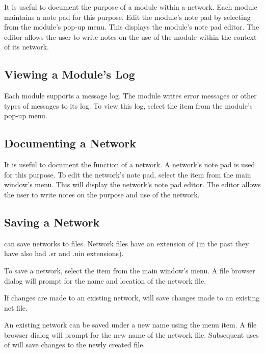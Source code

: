 It is useful to document the purpose of a module within a network.
Each module maintains a note pad for this purpose.  Edit the
module's note pad by selecting  from the module's
pop-up menu.  This displays the module's note pad editor.  The 
editor allows the user to write notes on the use of the
module within the context of its network.

\subsection{Viewing a Module's Log}
\label{sec:viewmodslog}

Each module supports a message log.  The module writes error messages or
other types of messages to its log.  To view this log, select the
 item from the module's pop-up menu.

\subsection{Documenting a Network}
\label{sec:docnetwork}

It is useful to document the function of a network.  A network's note
pad is used for this purpose.  To edit the network's note pad,
select the  item from the main window's 
menu.  This will display the network's note pad editor.  The editor
allows the user to write notes on the purpose and use of the network.


\subsection{Saving a Network}
\label{sec:savenet}

\sr{} can save networks to files.  Network files have an extension of
 (in the past they have also had .sr and .uin
extensions).  

To save a network, select the  item from the main window's
 menu.  A file browser dialog will prompt for the
name and location of the network file.

If  changes are made to an existing network,   will
save changes made to an existing net file.

An existing network can be saved under a new name using the
 menu item.  A file browser dialog will prompt
for the new name of the network file.  Subsequent uses of
 will save changes to the newly created file.

